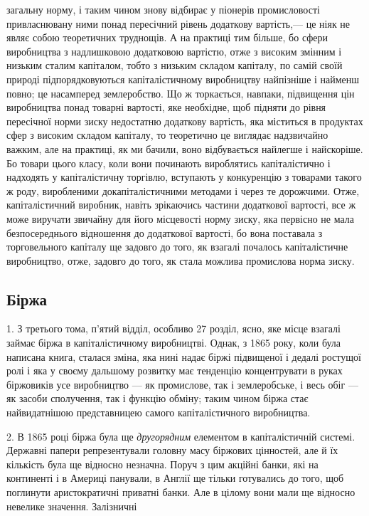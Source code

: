 \parcont{}  %
загальну норму, і таким чином знову відбирає у піонерів промисловості привласнювану ними понад пересічний рівень додаткову
вартість,— це ніяк не являє собою теоретичних труднощів. А на практиці тим більше, бо сфери виробництва з надлишковою
додатковою вартістю, отже з високим змінним і низьким сталим капіталом, тобто з низьким складом капіталу, по самій своїй
природі підпорядковуються капіталістичному виробництву найпізніше і найменш повно; це насамперед землеробство. Що ж
торкається, навпаки, підвищення цін виробництва понад товарні вартості, яке необхідне, щоб підняти до рівня пересічної норми
зиску недостатню додаткову вартість, яка міститься в продуктах сфер з високим складом капіталу, то теоретично це виглядає
надзвичайно важким, але на практиці, як ми бачили, воно відбувається найлегше і найскоріше. Бо товари цього класу, коли вони
починають вироблятись капіталістично і надходять у капіталістичну торгівлю, вступають у конкуренцію з товарами такого ж
роду, виробленими докапіталістичними методами і через те дорожчими. Отже, капіталістичний виробник, навіть зрікаючись
частини додаткової вартості, все ж може виручати звичайну для його місцевості норму зиску, яка первісно не мала
безпосереднього відношення до додаткової вартості, бо вона поставала з торговельного капіталу ще задовго до того, як взагалі
почалось капіталістичне виробництво, отже, задовго до того, як стала можлива промислова норма зиску.

\subsection{Біржа}

1. З третього тома, п’ятий відділ, особливо 27 розділ, ясно, яке місце взагалі займає біржа в капіталістичному виробництві. Однак, з 1865 року, коли була написана книга, сталася зміна, яка нині надає біржі підвищеної і дедалі ростущої ролі і яка у
своєму дальшому розвитку має тенденцію концентрувати в руках біржовиків усе виробництво — як промислове, так і землеробське,
і весь обіг — як засоби сполучення, так і функцію обміну; таким чином біржа стає найвидатнішою представницею самого
капіталістичного виробництва.

2. В 1865 році біржа була ще \emph{другорядним} елементом в капіталістичній системі. Державні папери
репрезентували головну масу біржових цінностей, але й їх кількість була ще відносно незначна. Поруч з цим акційні банки, які
на континенті і в Америці панували, в Англії ще тільки готувались до того, щоб поглинути аристократичні приватні банки. Але
в цілому вони мали ще відносно невелике значення. Залізничні
\parbreak{}  %
